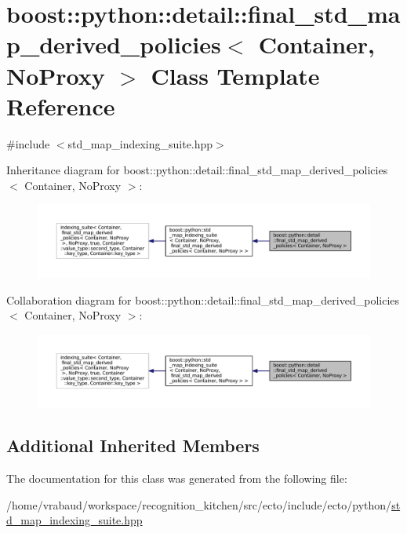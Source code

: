 \hypertarget{classboost_1_1python_1_1detail_1_1final__std__map__derived__policies}{}\section{boost\+:\+:python\+:\+:detail\+:\+:final\+\_\+std\+\_\+map\+\_\+derived\+\_\+policies$<$ Container, No\+Proxy $>$ Class Template Reference}
\label{classboost_1_1python_1_1detail_1_1final__std__map__derived__policies}


{\ttfamily \#include $<$std\+\_\+map\+\_\+indexing\+\_\+suite.\+hpp$>$}



Inheritance diagram for boost\+:\+:python\+:\+:detail\+:\+:final\+\_\+std\+\_\+map\+\_\+derived\+\_\+policies$<$ Container, No\+Proxy $>$\+:\nopagebreak
\begin{figure}[H]
\begin{center}
\leavevmode
\includegraphics[width=350pt]{classboost_1_1python_1_1detail_1_1final__std__map__derived__policies__inherit__graph}
\end{center}
\end{figure}


Collaboration diagram for boost\+:\+:python\+:\+:detail\+:\+:final\+\_\+std\+\_\+map\+\_\+derived\+\_\+policies$<$ Container, No\+Proxy $>$\+:\nopagebreak
\begin{figure}[H]
\begin{center}
\leavevmode
\includegraphics[width=350pt]{classboost_1_1python_1_1detail_1_1final__std__map__derived__policies__coll__graph}
\end{center}
\end{figure}
\subsection*{Additional Inherited Members}


The documentation for this class was generated from the following file\+:\begin{DoxyCompactItemize}
\item 
/home/vrabaud/workspace/recognition\+\_\+kitchen/src/ecto/include/ecto/python/\hyperlink{std__map__indexing__suite_8hpp}{std\+\_\+map\+\_\+indexing\+\_\+suite.\+hpp}\end{DoxyCompactItemize}
